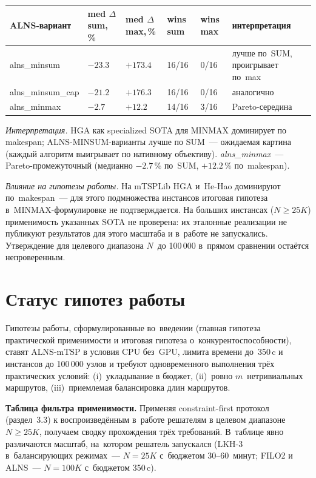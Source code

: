 \documentclass[a4paper,14pt]{extreport}
\begin{document}
\begin{center}\small
\begin{tabular}{|L{3.4cm}|R{1.5cm}|R{1.5cm}|R{1.5cm}|R{1.5cm}|R{2.2cm}|}
\hline
\textbf{ALNS-вариант} & \textbf{med $\Delta$ sum,\,\%} & \textbf{med $\Delta$ max,\,\%} & \textbf{wins sum} & \textbf{wins max} & \textbf{интерпретация} \\
\hline
alns\_minsum    & $-23.3$ & $+173.4$ & 16/16 & 0/16 & лучше по~SUM, проигрывает по~max \\
\hline
alns\_minsum\_cap & $-21.2$ & $+176.3$ & 16/16 & 0/16 & аналогично \\
\hline
alns\_minmax    & $-2.7$  & $+12.2$  & 14/16 & 3/16 & Pareto-середина \\
\hline
\end{tabular}
\end{center}

\textit{Интерпретация.} HGA как specialized SOTA для MINMAX доминирует по makespan; ALNS-MINSUM-варианты лучше по SUM~--- ожидаемая картина (каждый алгоритм выигрывает по нативному объективу). \emph{alns\_minmax}~--- Pareto-промежуточный (медианно $-2.7\,\%$ по~SUM, $+12.2\,\%$ по~makespan).

\textit{Влияние на гипотезы работы.} На mTSPLib HGA и~He-Hao доминируют по~makespan~--- для этого подмножества инстансов итоговая гипотеза в~MINMAX-формулировке не подтверждается. На больших инстансах ($N\geq 25K$) применимость указанных SOTA не проверена: их эталонные реализации не публикуют результатов для этого масштаба и в~работе не запускались. Утверждение для целевого диапазона $N$~до 100\,000 в~прямом сравнении остаётся непроверенным.

\section{Статус гипотез работы}
\label{sec:hypotheses-status}

Гипотезы работы, сформулированные во~введении (главная гипотеза практической применимости и итоговая гипотеза о~конкурентоспособности), ставят ALNS-mTSP в условия CPU без~GPU, лимита времени до~350\,c и инстансов до 100\,000 узлов и требуют одновременного выполнения трёх практических условий: (i)~укладывание в бюджет, (ii)~ровно $m$~нетривиальных маршрутов, (iii)~приемлемая балансировка длин маршрутов.

\medskip
\textbf{Таблица фильтра применимости.} Применяя constraint-first протокол (раздел~3.3) к воспроизведённым в~работе решателям в целевом диапазоне $N\geq 25K$, получаем сводку прохождения трёх требований. В~таблице явно различаются масштаб, на~котором решатель запускался (LKH-3 в~балансирующих режимах~--- $N=25K$ с~бюджетом 30--60~минут; FILO2 и ALNS~--- $N=100K$ с~бюджетом 350\,c).
\end{document}

